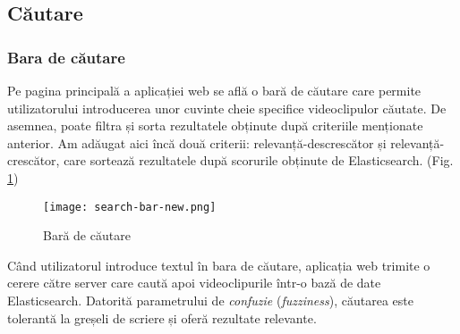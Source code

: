 \subsection{Căutare}
\subsubsection{Bara de căutare}
Pe pagina principală a aplicației web se află o bară de căutare care permite utilizatorului
introducerea unor cuvinte cheie specifice videoclipulor căutate. De asemnea, poate filtra
și sorta rezultatele obținute după criteriile menționate anterior. Am adăugat aici încă două
criterii: relevanță-descrescător și relevanță-crescător, care sortează rezultatele după
scorurile obținute de Elasticsearch.
(Fig. \ref{fig:search-bar})

\begin{figure}[h]
    \centering
    \texttt{[image: search-bar-new.png]}
    \caption{Bară de căutare}
    \label{fig:search-bar}
\end{figure}

\par
Când utilizatorul introduce textul în bara de căutare, aplicația web trimite o cerere 
către server care caută apoi videoclipurile într-o bază de date Elasticsearch. Datorită
parametrului de \textit{confuzie} (\textit{fuzziness}), căutarea este tolerantă la greșeli
de scriere și oferă rezultate relevante.

